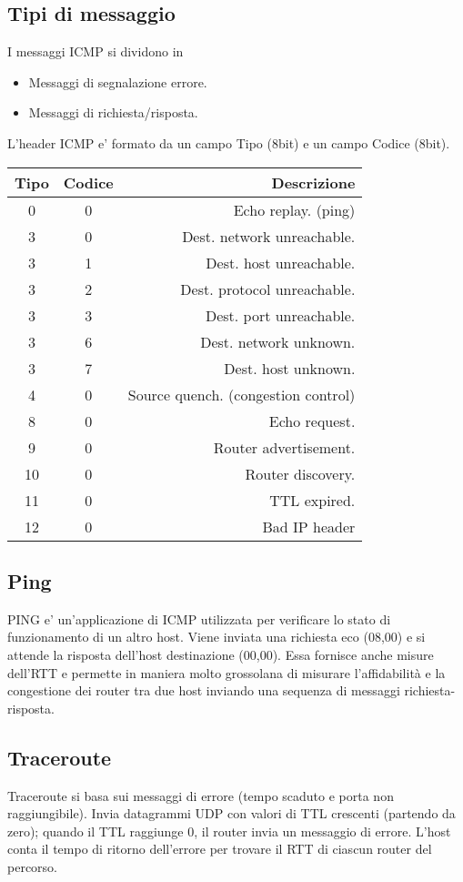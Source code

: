\subsection{Tipi di messaggio}
I messaggi ICMP si dividono in
\begin{itemize}
    \item Messaggi di segnalazione errore.
    \item Messaggi di richiesta/risposta.
\end{itemize}
L'header ICMP e' formato da un campo Tipo (8bit) e un campo Codice (8bit).
\begin{center}
    \begin{tabular}{||c c r||}
        \hline
        Tipo & Codice & Descrizione\\
        \hline\hline
        0 & 0 & Echo replay. (ping)\\
        3 & 0 & Dest. network unreachable.\\
        3 & 1 & Dest. host unreachable.\\
        3 & 2 & Dest. protocol unreachable.\\
        3 & 3 & Dest. port unreachable.\\
        3 & 6 & Dest. network unknown.\\
        3 & 7 & Dest. host unknown.\\
        4 & 0 & Source quench. (congestion control)\\
        8 & 0 & Echo request.\\
        9 & 0 & Router advertisement.\\
        10 & 0 & Router discovery.\\
        11 & 0 & TTL expired.\\
        12 & 0 & Bad IP header\\
        \hline
    \end{tabular}
\end{center}
\subsection{Ping} 
PING e' un'applicazione di ICMP utilizzata per verificare lo stato di funzionamento di un altro host.
Viene inviata una richiesta eco (08,00) e si attende la risposta dell'host destinazione (00,00).
Essa fornisce anche misure dell'RTT e permette in maniera molto grossolana di misurare l'affidabilità e la congestione dei router tra due host inviando una sequenza di messaggi richiesta-risposta.
\subsection{Traceroute}
Traceroute si basa sui messaggi di errore (tempo scaduto e porta non raggiungibile).
Invia datagrammi UDP con valori di TTL crescenti (partendo da zero); quando il TTL raggiunge 0, il router invia un messaggio di errore.
L'host conta il tempo di ritorno dell'errore per trovare il RTT di ciascun router del percorso.
